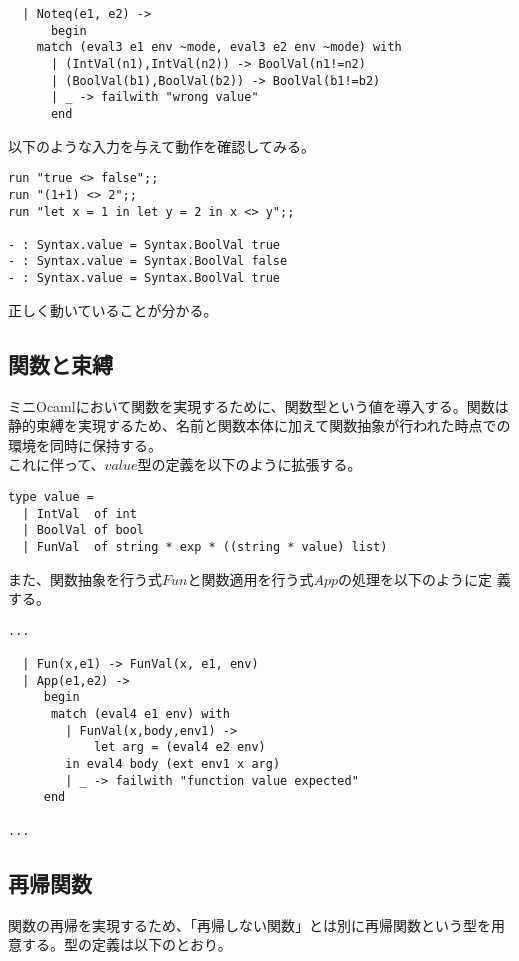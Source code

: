 \documentclass[a4paper,9pt]{jsarticle}
\begin{document}
\begin{lstlisting}
  | Noteq(e1, e2) ->
      begin
	match (eval3 e1 env ~mode, eval3 e2 env ~mode) with
	  | (IntVal(n1),IntVal(n2)) -> BoolVal(n1!=n2)
	  | (BoolVal(b1),BoolVal(b2)) -> BoolVal(b1!=b2)
	  | _ -> failwith "wrong value"
      end
\end{lstlisting}

以下のような入力を与えて動作を確認してみる。

\begin{lstlisting}
run "true <> false";;
run "(1+1) <> 2";;
run "let x = 1 in let y = 2 in x <> y";;

- : Syntax.value = Syntax.BoolVal true
- : Syntax.value = Syntax.BoolVal false
- : Syntax.value = Syntax.BoolVal true
\end{lstlisting}

正しく動いていることが分かる。

\subsection{関数と束縛}
ミニOcamlにおいて関数を実現するために、関数型という値を導入する。関数は
静的束縛を実現するため、名前と関数本体に加えて関数抽象が行われた時点での
環境を同時に保持する。\\

これに伴って、$value$型の定義を以下のように拡張する。
\begin{lstlisting}
type value = 
  | IntVal  of int        
  | BoolVal of bool       
  | FunVal  of string * exp * ((string * value) list) 
\end{lstlisting}

また、関数抽象を行う式$Fun$と関数適用を行う式$App$の処理を以下のように定
義する。

\begin{lstlisting}
...

  | Fun(x,e1) -> FunVal(x, e1, env)
  | App(e1,e2) ->
     begin
      match (eval4 e1 env) with
        | FunVal(x,body,env1) ->
            let arg = (eval4 e2 env) 
	    in eval4 body (ext env1 x arg)
        | _ -> failwith "function value expected"
     end

...
\end{lstlisting}

\subsection{再帰関数}
関数の再帰を実現するため、「再帰しない関数」とは別に再帰関数という型を用
意する。型の定義は以下のとおり。
\end{document}
